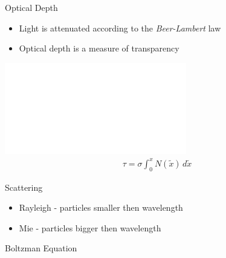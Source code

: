 \documentclass[compress,red,12pt]{beamer}
\newcommand{\derivsym}[1]{\,d{#1}}
\begin{document}
\begin{frame}{Optical Depth}
  \begin{overlayarea}{\textwidth}{3cm}
    \begin{itemize}
    \item <1-> Light is attenuated according to the {\em Beer-Lambert}
      law
    \item <2> Optical depth is a measure of transparency
    \end{itemize}
  \end{overlayarea}
  \begin{overlayarea}{\textwidth}{3cm}
    \begin{center}
       {
        \includegraphics<1>[width=0.5\columnwidth]{images/beer_lambert.pdf}
      }
       {
        \begin{align*}
          \tau = \sigma \int_{0}^x N(\tilde{x})\derivsym{\tilde{x}}
        \end{align*}
      }
    \end{center}
  \end{overlayarea}
\end{frame}

\begin{frame}{Scattering}
  \begin{itemize}
  \item Rayleigh - particles smaller then wavelength
  \item Mie - particles bigger then wavelength
  \end{itemize}
  \begin{center}
  \end{center}
\end{frame}

\begin{frame}{Boltzman Equation}
  
\end{frame}

\end{document}
